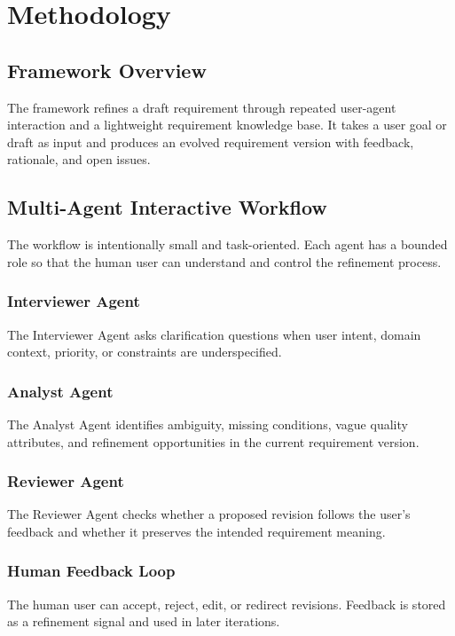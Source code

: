 \section{Methodology}
\label{methodology}

\subsection{Framework Overview}
\label{subsec:method-overview}
The framework refines a draft requirement through repeated user-agent interaction and a lightweight requirement knowledge base. It takes a user goal or draft as input and produces an evolved requirement version with feedback, rationale, and open issues.

\subsection{Multi-Agent Interactive Workflow}
\label{subsec:method-workflow}
The workflow is intentionally small and task-oriented. Each agent has a bounded role so that the human user can understand and control the refinement process.

\subsubsection{Interviewer Agent}
\label{subsubsec:method-interviewer}
The Interviewer Agent asks clarification questions when user intent, domain context, priority, or constraints are underspecified.

\subsubsection{Analyst Agent}
\label{subsubsec:method-analyst}
The Analyst Agent identifies ambiguity, missing conditions, vague quality attributes, and refinement opportunities in the current requirement version.

\subsubsection{Reviewer Agent}
\label{subsubsec:method-reviewer}
The Reviewer Agent checks whether a proposed revision follows the user's feedback and whether it preserves the intended requirement meaning.

\subsubsection{Human Feedback Loop}
\label{subsubsec:method-feedback-loop}
The human user can accept, reject, edit, or redirect revisions. Feedback is stored as a refinement signal and used in later iterations.

